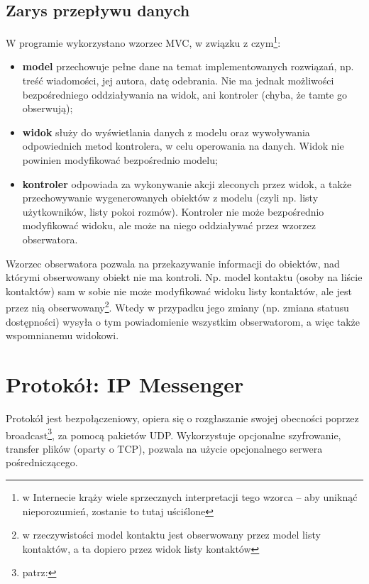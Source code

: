 \documentclass[11pt,leqno]{article}
\begin{document}
\subsection{Zarys przepływu danych}

W programie wykorzystano wzorzec MVC, w związku z czym\footnote{w Internecie krąży wiele
sprzecznych interpretacji tego wzorca -- aby uniknąć nieporozumień, zostanie to tutaj uściślone}:
\begin{itemize}
	\item \textbf{model} przechowuje pełne dane na temat implementowanych rozwiązań, np. treść
	wiadomości, jej autora, datę odebrania. Nie ma jednak możliwości bezpośredniego oddziaływania
	na widok, ani kontroler (chyba, że tamte go obserwują);
	\item \textbf{widok} służy do wyświetlania danych z modelu oraz wywoływania odpowiednich metod
	kontrolera, w celu operowania na danych. Widok nie powinien modyfikować bezpośrednio modelu;
	\item \textbf{kontroler} odpowiada za wykonywanie akcji zleconych przez widok, a także
	przechowywanie wygenerowanych obiektów z modelu (czyli np. listy użytkowników, listy pokoi
	rozmów). Kontroler nie może bezpośrednio modyfikować widoku, ale może na niego oddziaływać
	przez wzorzez obserwatora.
\end{itemize}

Wzorzec obserwatora pozwala na przekazywanie informacji do obiektów, nad którymi obserwowany
obiekt nie ma kontroli. Np. model kontaktu (osoby na liście kontaktów) sam w sobie nie może
modyfikować widoku listy kontaktów, ale jest przez nią obserwowany\footnote{w rzeczywistości model kontaktu
jest obserwowany przez model listy kontaktów, a ta dopiero przez widok listy kontaktów}. Wtedy
w przypadku jego zmiany (np. zmiana statusu dostępności) wysyła o tym powiadomienie wszystkim
obserwatorom, a więc także wspomnianemu widokowi.


\section{Protokół: IP Messenger}

Protokół jest bezpołączeniowy, opiera się o rozgłaszanie swojej obecności poprzez
broadcast\footnote{patrz: }, za pomocą pakietów UDP. Wykorzystuje
opcjonalne szyfrowanie, transfer plików (oparty o TCP), pozwala na użycie opcjonalnego serwera
pośredniczącego.
\end{document}
